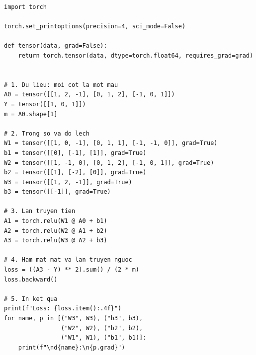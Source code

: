 \begin{lstlisting}[caption= Quá trình tính toán lan truyền tiến và lan truyền ngược cho một lô bằng Pytorch.]
import torch

torch.set_printoptions(precision=4, sci_mode=False)

def tensor(data, grad=False):
    return torch.tensor(data, dtype=torch.float64, requires_grad=grad)


# 1. Du lieu: moi cot la mot mau
A0 = tensor([[1, 2, -1], [0, 1, 2], [-1, 0, 1]])
Y = tensor([[1, 0, 1]])
m = A0.shape[1]

# 2. Trong so va do lech
W1 = tensor([[1, 0, -1], [0, 1, 1], [-1, -1, 0]], grad=True)
b1 = tensor([[0], [-1], [1]], grad=True)
W2 = tensor([[1, -1, 0], [0, 1, 2], [-1, 0, 1]], grad=True)
b2 = tensor([[1], [-2], [0]], grad=True)
W3 = tensor([[1, 2, -1]], grad=True)
b3 = tensor([[-1]], grad=True)

# 3. Lan truyen tien
A1 = torch.relu(W1 @ A0 + b1)
A2 = torch.relu(W2 @ A1 + b2)
A3 = torch.relu(W3 @ A2 + b3)

# 4. Ham mat mat va lan truyen nguoc
loss = ((A3 - Y) ** 2).sum() / (2 * m)
loss.backward()

# 5. In ket qua
print(f"Loss: {loss.item():.4f}")
for name, p in [("W3", W3), ("b3", b3),
                ("W2", W2), ("b2", b2),
                ("W1", W1), ("b1", b1)]:
    print(f"\nd{name}:\n{p.grad}")
\end{lstlisting}